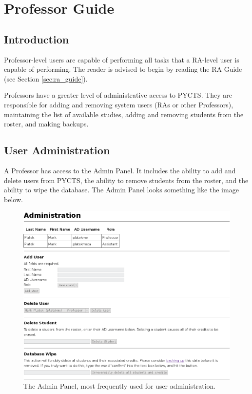 \documentclass[letterpaper,titlepage]{article}
\begin{document}
\section{Professor Guide}
\subsection{Introduction}
Professor-level users are capable of performing all tasks that a RA-level user is capable of performing. The reader is advised to begin by reading the RA Guide (see Section \ref{sec:ra_guide}).

Professors have a greater level of administrative access to PYCTS. They are responsible for adding and removing system users (RAs or other Professors), maintaining the list of available studies, adding and removing students from the roster, and making backups.

\subsection{User Administration}
A Professor has access to the Admin Panel. It includes the ability to add and delete users from PYCTS, the ability to remove students from the roster, and the ability to wipe the database. The Admin Panel looks something like the image below.

\begin{figure}[H]
\includegraphics[width=\textwidth]{images/prof_admin.png}
\caption{The Admin Panel, most frequently used for user administration.}
\label{prof_admin}
\end{figure}
\end{document}
